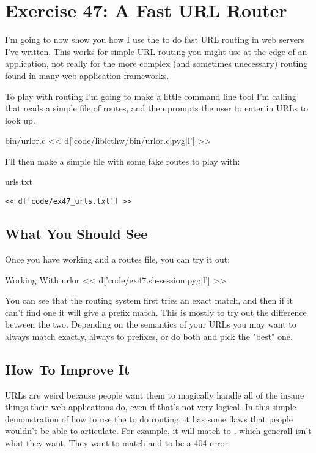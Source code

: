 \chapter{Exercise 47: A Fast URL Router}

I'm going to now show you how I use the  to do fast 
URL routing in web servers I've written.  This works for simple 
URL routing you might use at the edge of an application, not really
for the more complex (and sometimes unecessary) routing found in
many web application frameworks.

To play with routing I'm going to make a little command line tool I'm calling
 that reads a simple file of routes, and then prompts the user
to enter in URLs to look up.

\begin{code}{bin/urlor.c}
<< d['code/liblcthw/bin/urlor.c|pyg|l'] >>
\end{code}

I'll then make a simple file with some fake routes to play with:

\begin{code}{urls.txt}
\begin{Verbatim}
<< d['code/ex47_urls.txt'] >>
\end{Verbatim}
\end{code}

\section{What You Should See}

Once you have  working and a routes file, you can try it out:

\begin{code}{Working With urlor}
<< d['code/ex47.sh-session|pyg|l'] >>
\end{code}

You can see that the routing system first tries an exact match, and then if it
can't find one it will give a prefix match.  This is mostly to try out the 
difference between the two.  Depending on the semantics of your URLs you may
want to always match exactly, always to prefixes, or do both and pick the "best"
one.

\section{How To Improve It}

URLs are weird because people want them to magically handle all
of the insane things their web applications do, even if that's not very logical.
In this  simple demonstration of how to use the  to do routing,
it has some flaws that people wouldn't be able to articulate.  For example,
it will match  to , which generall isn't what they want.
They want  to match  and  to be a 404
error.

